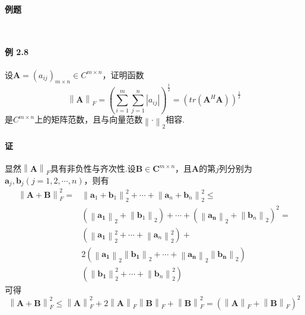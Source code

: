 \documentclass[12pt, a4paper, oneside, fontset=none]{ctexart}
\begin{document}
\par \ \par

\centerline{\large{\textbf{例题}}} \ \par

\paragraph*{例 2.8} 设$\bm{A} = (a_{ij})_{m\times n} \in C^{m\times n}$，证明函数
\[
    \left\lVert \bm{A} \right\rVert _F = (\sum_{i=1}^m \sum_{j=1}^n \left\lvert a_{ij} \right\rvert)^\frac{1}{2} = (tr(\bm{A}^H\bm{A}))^\frac{1}{2}
\]
是$C^{m\times n}$上的矩阵范数，且与向量范数$\left\lVert \bm{\cdot} \right\rVert _2$相容.

\paragraph*{证} 显然$\left\lVert \bm{A} \right\rVert _F$具有非负性与齐次性.设$\bm{B} \in \bm{C}^{m\times n}$，且$\bm{A}$的第$j$列分别为$\bm{a}_j,\bm{b}_j(j =
    1,2,\cdots,n)$，则有
\begin{align*}
    \left\lVert \bm{A} + \bm{B} \right\rVert ^2_F = & \left\lVert \bm{a}_1 + \bm{b}_1 \right\rVert ^2_2 + \cdots + \left\lVert \bm{a}_n + \bm{b}_n \right\rVert ^2_2 \leqslant                                                   \\
                                                    & (\left\lVert \bm{a_1} \right\rVert _2 + \left\lVert \bm{b}_1 \right\rVert _2) + \cdots + (\left\lVert \bm{a_n} \right\rVert _2 + \left\lVert \bm{b}_n \right\rVert _2)^2 = \\
                                                    & (\left\lVert \bm{a_1} \right\rVert ^2_2 + \cdots + \left\lVert \bm{a}_n \right\rVert ^2_2) +                                                                               \\
                                                    & 2(\left\lVert \bm{a_1} \right\rVert _2\left\lVert \bm{b_1} \right\rVert _2 + \cdots + \left\lVert \bm{a_n} \right\rVert _2 \left\lVert \bm{b_n} \right\rVert _2)           \\
                                                    & (\left\lVert \bm{b_1} \right\rVert ^2_2 + \cdots + \left\lVert \bm{b}_n \right\rVert ^2_2)
\end{align*}
可得
\[
    \left\lVert \bm{A} + \bm{B} \right\rVert _F^2 \leqslant \left\lVert \bm{A} \right\rVert ^2_F + 2\left\lVert \bm{A} \right\rVert _F \left\lVert \bm{B} \right\rVert _F + \left\lVert \bm{B} \right\rVert ^2_F = (\left\lVert \bm{A} \right\rVert _F + \left\lVert \bm{B} \right\rVert _F)^2
\]
\end{document}
